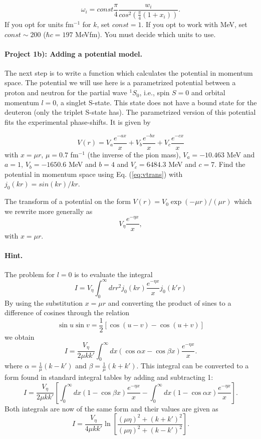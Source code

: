\documentclass[%
oneside,                 %
final,                   %
10pt]{article}
\begin{document}
\begin{equation*}
            \omega_i= const\frac{\pi}{4}\frac{w_i}{cos^2\left(\frac{\pi}{4}(1+x_i)\right)}.
         \end{equation*}
If you opt for units fm$^{-1}$ for $k$, set $const=1$. If you opt to work
with MeV, set $const\sim 200$ ($\hbar c=197$ MeVfm).
You must decide which units to use.

\paragraph{Project 1b): Adding a potential model.}
The next step is to write a function which calculates the potential
in momentum space. The potential we will use here is a parametrized  potential
between a proton and neutron for the partial wave  $^1S_{0}$, 
i.e., spin $S=0$ and
orbital momentum $l=0$, a singlet S-state. 
This state does not have a bound state
for the deuteron (only the triplet S-state has). 
The parametrized version of this potential fits the experimental
phase-shifts. It is given by

\begin{equation}
  V(r)=V_a \frac{e^{-ax}}{x}+V_b \frac{e^{-bx}}{x}+V_c \frac{e^{-cx}}{x}
  \label{eq:realp}
\end{equation}
with $x=\mu r$, $\mu=0.7$ fm$^{-1}$ (the inverse of the pion mass),
$V_a=-10.463$ MeV and $a=1$, $V_b=-1650.6$ MeV and $b=4$ and
$V_c=6484.3$ MeV and $c=7$. 
Find the potential in momentum space using Eq. (\ref{eq:vtrans})
with $j_0(kr)=sin(kr)/kr$. 

The transform of a potential on the form 
$V(r)=V_0\exp{(-\mu r)}/(\mu r)$ which we rewrite more generally as 
\[
V_{\eta}\frac{e^{-\eta x}}{x},
\]
with $x=\mu r$.
\paragraph{Hint.}

The problem for $l=0$ is to evaluate the integral 
\[
I=V_{\eta}\int_{0}^{\infty}dr r^{2}j_{0}(kr)\frac{e^{-\eta x}}{x}j_{0}(k'r)
\]
By using the substitution $x=\mu r$ and converting the product 
of sines to a difference of cosines through the relation 
\[
\sin u\sin v=\frac{1}{2}[\cos(u-v)-\cos(u+v)]
\]
we obtain
\[
I=\frac{V_{\eta}}{2\mu kk'}\int_{0}^{\infty}dx (\cos\alpha x-\cos\beta x)
\frac{e^{-\eta x}}{x}.
\]
where $\alpha=\frac{1}{\mu}(k-k')$ and $\beta=\frac{1}{\mu}(k+k')$.
This integral can be converted to a form found in standard integral 
tables by adding and subtracting 1:
\[
I=\frac{V_{\eta}}{2\mu kk'}\left[\int_{0}^{\infty}dx(1-\cos\beta x)
\frac{e^{-\eta x}}{x}-\int_{0}^{\infty}dx(1-\cos\alpha x)\frac{e^{-\eta x}}
{x}\right].
\]
Both integrals are now of the same form and their values are given as
\[
I=\frac{V_{\eta}}{4\mu k k'}\ln\left[\frac{(\mu \eta)^{2}+(k+k')^{2}}
{(\mu\eta)^{2}+(k-k')^{2}}\right].
\]
\end{document}
